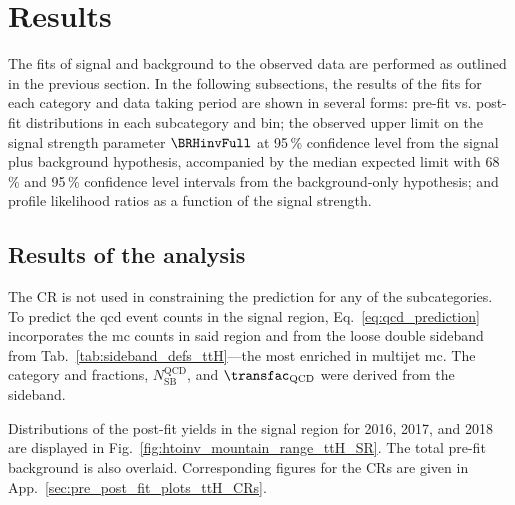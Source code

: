 \section{Results}
\label{sec:htoinv_results}

The fits of signal and background to the observed data are performed as outlined in the previous section. In the following subsections, the results of the fits for each category and data taking period are shown in several forms: pre-fit vs. post-fit distributions in each subcategory and \ptmiss bin; the observed upper limit on the signal strength parameter $\BRHinvFull$ at 95\,\% confidence level from the signal plus background hypothesis, accompanied by the median expected limit with 68\,\% and 95\,\% confidence level intervals from the background-only hypothesis; and profile likelihood ratios as a function of the signal strength.




\subsection{Results of the \texorpdfstring{\ttH}{ttH} analysis}
\label{subsec:htoinv_analysis_ttH}

The \singlePhotonCr \gls{CR} is not used in constraining the \ztonunu prediction for any of the subcategories. To predict the \acrshort{qcd} event counts in the signal region, Eq.~\ref{eq:qcd_prediction} incorporates the \acrshort{mc} counts in said region and from the loose double sideband from Tab.~\ref{tab:sideband_defs_ttH}---the most enriched in multijet \acrshort{mc}. The category and \ptmiss fractions, $N_{\mathrm{SB}}^{\mathrm{QCD}}$, and $\transfac_{\mathrm{QCD}}$ were derived from the sideband.

Distributions of the post-fit yields in the signal region for 2016, 2017, and 2018 are displayed in Fig.~\ref{fig:htoinv_mountain_range_ttH_SR}. The total pre-fit background is also overlaid. Corresponding figures for the \glspl{CR} are given in App.~\ref{sec:pre_post_fit_plots_ttH_CRs}.

